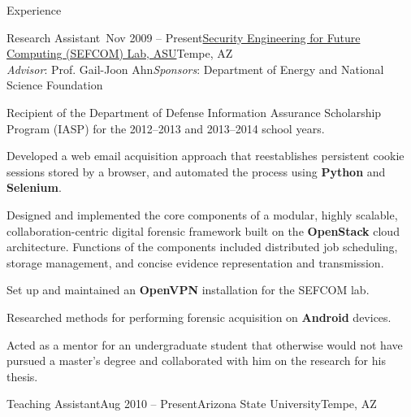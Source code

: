 \documentclass{resume} %
\begin{document}
\begin{rSection}{Experience}


\begin{rSubsection}{Research Assistant~}{Nov 2009 -- Present}{\href{http://sefcom.asu.edu/}{Security Engineering for Future Computing (SEFCOM) Lab, ASU}}{Tempe, AZ\\{\textnormal{\textit{Advisor}: Prof. Gail-Joon Ahn\hfill \textit{Sponsors}: Department of Energy and National Science Foundation}}}
	
	\item Recipient of the Department of Defense Information Assurance Scholarship Program (IASP) for the 2012--2013 and 2013--2014 school years.
	
	\item Developed a web email acquisition approach that reestablishes persistent cookie sessions stored by a browser, and automated the process using \textbf{Python} and \textbf{Selenium}.
	
	\item Designed and implemented the core components of a modular, highly scalable, collaboration-centric digital forensic framework built on the \textbf{OpenStack} cloud architecture. Functions of the components included distributed job scheduling, storage management, and concise evidence representation and transmission.
	
	\item Set up and maintained an \textbf{OpenVPN} installation for the SEFCOM lab.
		
	\item Researched methods for performing forensic acquisition on \textbf{Android} devices.
	
	\item Acted as a mentor for an undergraduate student that otherwise would not have pursued a master's degree and collaborated with him on the research for his thesis.
	
\end{rSubsection}


\begin{rSubsection}{Teaching Assistant}{Aug 2010 -- Present}{Arizona State University}{Tempe, AZ}
	

\end{rSubsection}
\end{rSection}
\end{document}
